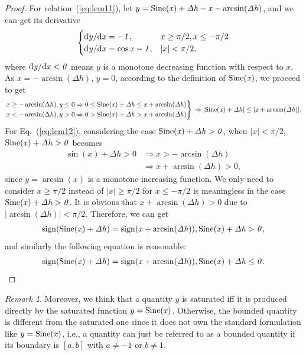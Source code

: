 \documentclass[3p]{elsarticle}
\theoremstyle{plain}
\theoremstyle{remark}
\newtheorem{myrem}{Remark}
\begin{document}
\begin{proof}
For relation~(\ref{eq:lem11}), let $y=\rm{Sine}\it{(x)}+\Delta h-x-\arcsin(\Delta h)$, and we can get its derivative
\begin{align}
\begin{cases}
\rm{d}\it{y}/\rm{d}\it{x} = -1,&x\ge\pi/2,x\le-\pi/2\\
\rm{d}\it{y}/\rm{d}\it{x} = \cos x - 1,&\vert x\vert<\pi/2,
\end{cases}
\end{align}
where $\rm{d}\it{y}/\rm{d}\it{x}<0$ means $y$ is a monotone decreasing function with respect to $x$. As $x=-\arcsin(\Delta h)$, $y=0$, according to the definition of $\rm{Sine}\it{(x)}$, we proceed to get
$$\left.
\begin{aligned}
x\ge-\arcsin(\Delta h), y\le0&\Rightarrow 0\le \rm{Sine}\it{(x)}+\Delta h\le x+\arcsin(\Delta h)\\
x<-\arcsin(\Delta h), y>0&\Rightarrow 0> \rm{Sine}\it{(x)}+\Delta h>x+\arcsin(\Delta h)\end{aligned}\right\}\\\\
\Rightarrow\vert \rm{Sine}\it{(x)}+\Delta h\vert\le\vert x+\arcsin(\Delta h)\vert.
$$
For Eq.~(\ref{eq:lem12}), considering the case $\rm{Sine}\it{(x)}+\Delta h>0$, when $\vert x\vert<\pi/2$, $\rm{Sine}\it{(x)}+\Delta h>0$ becomes
\begin{align}
\sin(x)+\Delta h>0&\Rightarrow x>-\arcsin(\Delta h)\\
&\Rightarrow x+\arcsin(\Delta h)>0,
\end{align}
since $y=\arcsin(x)$ is a monotone increasing function. We only need to consider $x\ge\pi/2$ instead of $\vert x\vert\ge\pi/2$ for $x\le-\pi/2$ is meaningless in the case $\rm{Sine}\it{(x)}+\Delta h>0$. It is obvious that $x+\arcsin(\Delta h)>0$ due to $\vert \arcsin(\Delta h)\vert<\pi/2$. Therefore, we can get
\begin{align}
\rm{sign}(\rm{Sine}\it{(x)}+\Delta h)=\rm{sign}\it{(x}+\arcsin(\Delta h)),\rm{Sine}\it{(x)}+\Delta h>0,
\end{align}
and similarly the following equation is reasonable:
\begin{align}
\rm{sign}(\rm{Sine}\it{(x)}+\Delta h)=\rm{sign}\it{(x}+\arcsin(\Delta h)),\rm{Sine}\it{(x)}+\Delta h\le0.
\end{align}
\end{proof}
\begin{myrem}Moreover, we think that a quantity $y$ is saturated iff it is produced directly by the saturated function $y=\rm{Sine}\it{(x)}$. Otherwise, the bounded quantity is different from the saturated one since it does not own the standard formulation like $y=\rm{Sine}\it{(x)}$, i.e., a quantity can just be referred to as a bounded quantity if its boundary is $[a,b]$ with $a\neq -1$ or $b\neq 1$.
\end{myrem}
\end{document}
